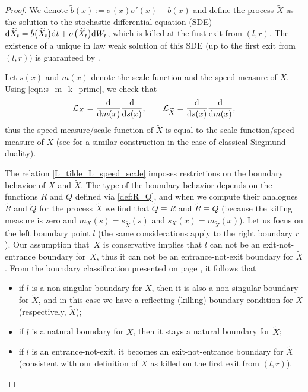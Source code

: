 \documentclass[pdftex]{sigma}
\numberwithin{equation}{section}
\theoremstyle{definition}
\def\L{{\mathcal L}}
\def\d{{\textnormal d}}
\begin{document}
\begin{proof}
We denote $\tilde b(x):=\sigma(x)\sigma'(x) - b(x)$ and define the process $\widetilde X$ as the solution to the stochastic differential equation (SDE)
$
\d \widetilde X_t=\tilde b\bigl(\widetilde X_t\bigr) \d t+\sigma\bigl(\widetilde X_t\bigr) \d W_t$,
which is killed at the first exit from $(l,r)$. The existence of a unique in law weak solution of this SDE (up to the first exit from $(l,r)$) is guaranteed by \cite[Theorem 5.15]{Karatzas_Shreve_1988}.

Let $s(x)$ and $m(x)$ denote the scale function and the speed measure of $X$. Using \eqref{eqn:s_m_k_prime}, we check that
 \begin{equation}\label{L_tilde_L_speed_scale}
 \L_X=\frac{\d}{\d m(x)}\frac{\d}{\d s(x)}, \qquad
 \L_{\widetilde X}=\frac{\d}{\d s(x)}\frac{\d}{\d m(x)},
 \end{equation}
thus the speed measure/scale function of $\widetilde X$ is equal to the scale function/speed measure of $X$ (see \cite[Section 4]{Cox_1984} for a similar construction in the case of classical Siegmund duality).

The relation \eqref{L_tilde_L_speed_scale} imposes restrictions on the boundary behavior of $X$ and $\widetilde X$. The type of the boundary behavior depends on the functions $R$ and $Q$ defined via \eqref{def:R_Q}, and when we compute their analogues $\widetilde R$ and $\widetilde Q$ for the process $\widetilde X$ we find that
 $\widetilde Q\equiv R$ and $\widetilde R \equiv Q$ (because the killing measure is zero and
 $m_X(s)=s_{\widetilde X}(s)$ and $s_X(x)=m_{\widetilde X}(x)$).
 Let us focus on the left boundary point $l$ (the same considerations apply to the right boundary $r$). Our assumption that~$X$ is conservative implies that $l$ can not be an exit-not-entrance boundary for~$X$, thus it can not be an entrance-not-exit boundary for $\widetilde X$. From the boundary classification presented on page \pageref{def:R_Q}, it follows that
\begin{itemize}\itemsep=0pt
\item[(i)] if $l$ is a non-singular boundary for $X$, then it is also a non-singular boundary for $\widetilde X$, and in this case we have a reflecting (killing) boundary condition for $X$ (respectively, $\widetilde X$);
\item[(ii)] if $l$ is a natural boundary for $X$, then it stays a natural boundary for $\widetilde X$;
\item[(iii)] if $l$ is an entrance-not-exit, it becomes an exit-not-entrance boundary for $\widetilde X$ (consistent with our definition of $\widetilde X$ as killed on the first exit from $(l,r)$).
\end{itemize}


\end{proof}
\end{document}
